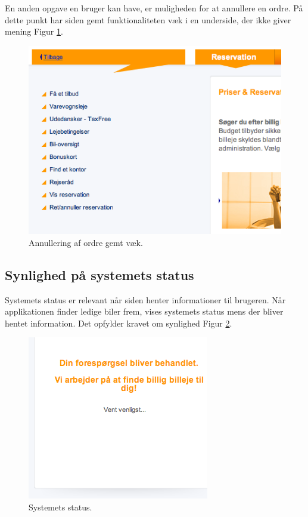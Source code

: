 \documentclass[a4paper]{article}
\begin{document}
En anden opgave en bruger kan have, er muligheden for at annullere en ordre. På
dette punkt har siden gemt funktionaliteten væk i en underside, der ikke giver
mening Figur \ref{annullering}.

\begin{figure}[htbp]
  \begin{center}
    \includegraphics[scale=.6]{3.png}
  \end{center}
  \caption{Annullering af ordre gemt væk.}
  \label{annullering}
\end{figure}

\subsection{Synlighed på systemets status}
Systemets status er relevant når siden henter informationer til brugeren. Når
applikationen finder ledige biler frem, vises systemets status mens der bliver
hentet information. Det opfylder kravet om synlighed Figur \ref{status}.

\begin{figure}[htbp]
  \begin{center}
    \includegraphics[scale=.6]{4.png}
  \end{center}
  \caption{Systemets status.}
  \label{status}
\end{figure}
\end{document}
